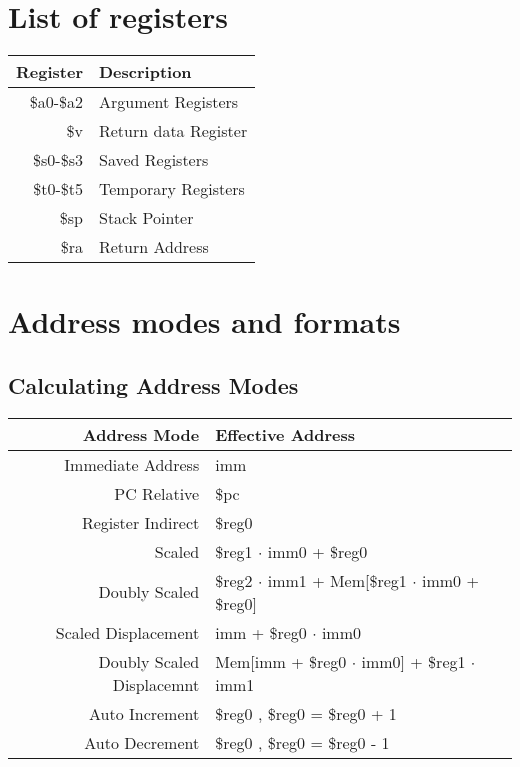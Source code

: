 \documentclass[12pt]{article}
\begin{document}
\section{List of registers}
\begin{tabular}{| r | l |}
\hline
\textbf{Register} & \textbf{Description}\\
\hline
\$a0-\$a2 & Argument Registers\\
\$v & Return data Register\\
\$s0-\$s3 & Saved Registers\\
\$t0-\$t5 & Temporary Registers\\
\$sp & Stack Pointer\\
\$ra & Return Address\\ 
\hline
\end {tabular}

\section{Address modes and formats}
\subsection{Calculating Address Modes}
\begin{tabular}{| r | l |}
\hline
\textbf{Address Mode} & \textbf {Effective Address} \\
\hline
Immediate Address & imm\\
PC Relative & \$pc \\
Register Indirect & \$reg0\\
Scaled & \$reg1 $\cdot$ imm0 + \$reg0\\
Doubly Scaled & \$reg2 $\cdot$ imm1 + Mem[\$reg1 $\cdot$ imm0 + \$reg0]\\
Scaled Displacement & imm + \$reg0 $\cdot$ imm0\\
Doubly Scaled Displacemnt & Mem[imm + \$reg0 $\cdot$ imm0] + \$reg1 $\cdot$ imm1\\
Auto Increment & \$reg0 , \$reg0 = \$reg0 + 1\\
Auto Decrement & \$reg0 , \$reg0 = \$reg0 - 1\\
\hline
\end{tabular}
\end{document}
